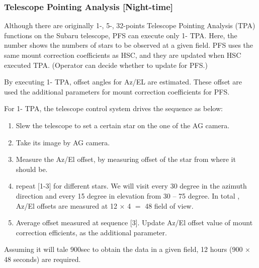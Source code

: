 \subsubsection{Telescope Pointing Analysis [Night-time]}\label{secflow:TPA1}


Although there are originally 1-, 5-, 32-points Telescope Pointing Analysis (TPA) functions on the Subaru telescope, PFS can execute only 1- TPA.
Here, the number shows the numbers of stars to be observed at a given field.
PFS uses the same mount correction coefficients as HSC, and they are updated when HSC executed TPA.
(Operator can decide whether to update for PFS.)

By executing 1- TPA, offset angles for Az/EL are estimated.
These offset are used the additional parameters for mount correction coefficients for PFS.

For 1- TPA, the telescope control system drives the sequence as below:
\begin{enumerate}
\item Slew the telescope to set a certain star on the one of the AG camera.
\item Take its image by AG camera.
\item Measure the Az/El offset, by measuring offset of the star from where it should be.
\item repeat [1-3] for different stars.
We will visit every 30 degree in the azimuth direction and every 15 degree in elevation from 30 -- 75 degree.
In total , Az/El offsets are  measured at 12 $\times$ 4 $=$ 48 field of view.
\item Average offset measured at sequence [3].
Update Az/El offset value of mount correction efficients, as the additional parameter.
\end{enumerate}

Assuming it will tale 900sec to obtain the data in a given field, 12 hours (900 $\times$ 48 seconds) are required.


